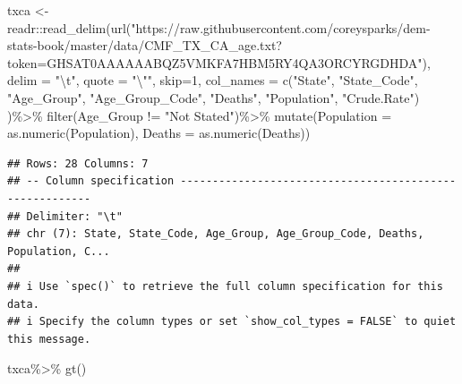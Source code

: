 \documentclass[
]{article}
\newenvironment{Shaded}{\begin{snugshade}}{\end{snugshade}}
\newcommand{\AttributeTok}[1]{\textcolor[rgb]{0.77,0.63,0.00}{#1}}
\newcommand{\DecValTok}[1]{\textcolor[rgb]{0.00,0.00,0.81}{#1}}
\newcommand{\FunctionTok}[1]{\textcolor[rgb]{0.00,0.00,0.00}{#1}}
\newcommand{\NormalTok}[1]{#1}
\newcommand{\OtherTok}[1]{\textcolor[rgb]{0.56,0.35,0.01}{#1}}
\newcommand{\SpecialCharTok}[1]{\textcolor[rgb]{0.00,0.00,0.00}{#1}}
\newcommand{\StringTok}[1]{\textcolor[rgb]{0.31,0.60,0.02}{#1}}
\begin{document}
\begin{Shaded}
\begin{Highlighting}[]
\NormalTok{txca }\OtherTok{\textless{}{-}}\NormalTok{ readr}\SpecialCharTok{::}\FunctionTok{read\_delim}\NormalTok{(}\FunctionTok{url}\NormalTok{(}\StringTok{"https://raw.githubusercontent.com/coreysparks/dem{-}stats{-}book/master/data/CMF\_TX\_CA\_age.txt?token=GHSAT0AAAAAABQZ5VMKFA7HBM5RY4QA3ORCYRGDHDA"}\NormalTok{),}
                          \AttributeTok{delim =} \StringTok{"}\SpecialCharTok{\textbackslash{}t}\StringTok{"}\NormalTok{,}
                          \AttributeTok{quote =} \StringTok{"}\SpecialCharTok{\textbackslash{}"}\StringTok{"}\NormalTok{,}
                          \AttributeTok{skip=}\DecValTok{1}\NormalTok{,}
                          \AttributeTok{col\_names =} \FunctionTok{c}\NormalTok{(}\StringTok{"State"}\NormalTok{,}
                                        \StringTok{"State\_Code"}\NormalTok{,}
                                        \StringTok{"Age\_Group"}\NormalTok{,}
                                        \StringTok{"Age\_Group\_Code"}\NormalTok{,}
                                        \StringTok{"Deaths"}\NormalTok{,}
                                        \StringTok{"Population"}\NormalTok{,}
                                        \StringTok{"Crude.Rate"}\NormalTok{)}
\NormalTok{                          )}\SpecialCharTok{\%\textgreater{}\%}
  \FunctionTok{filter}\NormalTok{(Age\_Group }\SpecialCharTok{!=} \StringTok{"Not Stated"}\NormalTok{)}\SpecialCharTok{\%\textgreater{}\%}
  \FunctionTok{mutate}\NormalTok{(}\AttributeTok{Population =} \FunctionTok{as.numeric}\NormalTok{(Population), }\AttributeTok{Deaths =} \FunctionTok{as.numeric}\NormalTok{(Deaths))}
\end{Highlighting}
\end{Shaded}

\begin{verbatim}
## Rows: 28 Columns: 7
## -- Column specification --------------------------------------------------------
## Delimiter: "\t"
## chr (7): State, State_Code, Age_Group, Age_Group_Code, Deaths, Population, C...
## 
## i Use `spec()` to retrieve the full column specification for this data.
## i Specify the column types or set `show_col_types = FALSE` to quiet this message.
\end{verbatim}

\begin{Shaded}
\begin{Highlighting}[]
\NormalTok{txca}\SpecialCharTok{\%\textgreater{}\%}
  \FunctionTok{gt}\NormalTok{()}
\end{Highlighting}
\end{Shaded}
\end{document}
